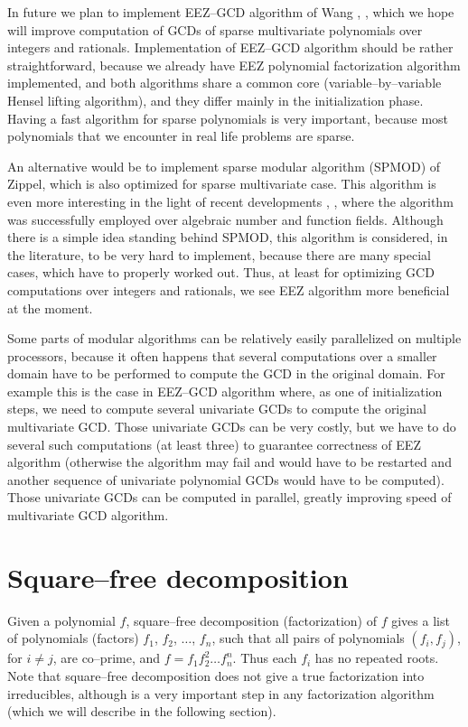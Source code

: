 In future we plan to implement EEZ--GCD algorithm of Wang \cite{Wang1980eezgcd}, \cite{Moses1973ezgcd},
which we hope will improve computation of GCDs of sparse multivariate polynomials over integers
and rationals. Implementation of EEZ--GCD algorithm should be rather straightforward, because
we already have EEZ polynomial factorization algorithm implemented, and both algorithms share
a common core (variable--by--variable Hensel lifting algorithm), and they differ mainly in the
initialization phase. Having a fast algorithm for sparse polynomials is very important, because
most polynomials that we encounter in real life problems are sparse.

An alternative would be to implement sparse modular algorithm (SPMOD) of Zippel, which is also
optimized for sparse multivariate case. This algorithm is even more interesting in the light
of recent developments \cite{Monagan2004algebraic}, \cite{Javadi2007spmod}, where the algorithm was
successfully employed over algebraic number and function fields. Although there is a simple
idea standing behind SPMOD, this algorithm is considered, in the literature, to be very hard
to implement, because there are many special cases, which have to properly worked out. Thus,
at least for optimizing GCD computations over integers and rationals, we see EEZ algorithm
more beneficial at the moment.

Some parts of modular algorithms can be relatively easily parallelized on multiple processors,
because it often happens that several computations over a smaller domain have to be performed
to compute the GCD in the original domain. For example this is the case in EEZ--GCD algorithm
where, as one of initialization steps, we need to compute several univariate GCDs to compute
the original multivariate GCD. Those univariate GCDs can be very costly, but we have to do
several such computations (at least three) to guarantee correctness of EEZ algorithm (otherwise
the algorithm may fail and would have to be restarted and another sequence of univariate
polynomial GCDs would have to be computed). Those univariate GCDs can be computed in parallel,
greatly improving speed of multivariate GCD algorithm.


\section{Square--free decomposition}

Given a polynomial $f$, square--free decomposition (factorization) of $f$ gives a list of
polynomials (factors) $f_1$, $f_2$, $\ldots$, $f_n$, such that all pairs of polynomials
$(f_i, f_j)$, for $i \not= j$, are co--prime, and $f = f_1 f_2^2 \ldots f_n^n$. Thus each
$f_i$ has no repeated roots. Note that square--free decomposition does not give a true
factorization into irreducibles, although is a very important step in any factorization
algorithm (which we will describe in the following section).


